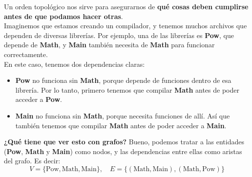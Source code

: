 \documentclass[10pt,a4paper]{article}
\begin{document}
Un orden topológico nos sirve para asegurarnos de \textbf{qué cosas deben cumplirse antes de que podamos hacer otras}. \\
Imaginemos que estamos creando un compilador, y tenemos muchos archivos que dependen de diversas librerías. Por ejemplo, una de las librerías es \textbf{Pow}, que depende de \textbf{Math}, y \textbf{Main} también necesita de \textbf{Math} para funcionar correctamente. \\
En este caso, tenemos dos dependencias claras:
\begin{itemize}
    \item \textbf{Pow} no funciona sin \textbf{Math}, porque depende de funciones dentro de esa librería. Por lo tanto, primero tenemos que compilar \textbf{Math} antes de poder acceder a \textbf{Pow}.
    \item \textbf{Main} no funciona sin \textbf{Math}, porque necesita funciones de allí. Así que también tenemos que compilar \textbf{Math} antes de poder acceder a \textbf{Main}.
\end{itemize}
\textbf{¿Qué tiene que ver esto con grafos?} Bueno, podemos tratar a las entidades (\textbf{Pow}, \textbf{Math} y \textbf{Main}) como nodos, y las dependencias entre ellas como aristas del grafo. Es decir:
\[
V = \{ \text{Pow}, \text{Math}, \text{Main} \}, \quad E = \{ (\text{Math}, \text{Main}), (\text{Math}, \text{Pow}) \}
\]
\end{document}

